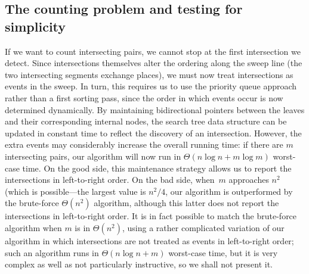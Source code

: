 \documentclass[11pt]{article}
\begin{document}
\subsection{The counting problem and testing for simplicity}
If we want to count intersecting pairs, we cannot stop at the first
intersection we detect.  Since intersections themselves alter the
ordering along the sweep line (the two intersecting segments exchange
places), we must now treat intersections as events in the sweep.
In turn, this requires us to use the priority queue approach rather
than a first sorting pass, since the order in which events occur is
now determined dynamically.
By maintaining bidirectional pointers between the leaves
and their corresponding internal nodes, the search tree data structure can
be updated in constant time to reflect the discovery of an intersection.
However, the extra events may considerably increase the overall
running time: if there are $m$ intersecting pairs, our algorithm
will now run in $\Theta(n \log n + m \log m)$ worst-case time.
On the good side, this maintenance strategy allows us to report
the intersections in left-to-right order.  On the bad side, when~$m$ approaches
$n^2$ (which is possible---the largest value is $n^2/4$, our algorithm is
outperformed by the brute-force $\Theta(n^2)$ algorithm,
although this latter does not report the intersections in left-to-right order.
It is in fact possible to match the brute-force algorithm when $m$
is in $\Theta(n^2)$, using a rather complicated variation of our algorithm
in which intersections are not treated as events in left-to-right order;
such an algorithm runs in $\Theta(n\log n + m)$ worst-case time, but it
is very complex as well as not particularly instructive, so we shall
not present it.
\end{document}
